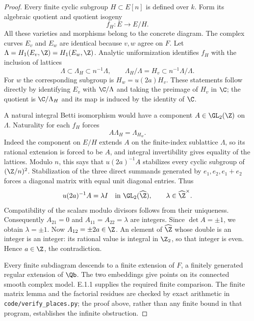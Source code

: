 \begin{proof}
Every finite cyclic subgroup $H\subset E[n]$ is defined over $k$. Form its algebraic quotient and quotient isogeny
\[
 f_H:E\longrightarrow E/H.
\]
All these varieties and morphisms belong to the concrete diagram. The complex curves $E_v$ and $E_w$ are identical because $v,w$ agree on $F$. Let $\Lambda=H_1(E_v,\Z)=H_1(E_w,\Z)$. Analytic uniformization identifies $f_H$ with the inclusion of lattices
\[
 \Lambda\subset\Lambda_H\subset n^{-1}\Lambda,
 \qquad \Lambda_H/\Lambda=H_v\subset n^{-1}\Lambda/\Lambda.
\]
For $w$ the corresponding subgroup is $H_w=u(2a)H_v$. These statements follow directly by identifying $E_v$ with $\C/\Lambda$ and taking the preimage of $H_v$ in $\C$; the quotient is $\C/\Lambda_H$ and its map is induced by the identity of $\C$.

A natural integral Betti isomorphism would have a component $A\in\GL_2(\Z)$ on $\Lambda$. Naturality for each $f_H$ forces
\[
 A\Lambda_H=\Lambda_{H_w}.
\]
Indeed the component on $E/H$ extends $A$ on the finite-index sublattice $\Lambda$, so its rational extension is forced to be $A$, and integral invertibility gives equality of the lattices. Modulo $n$, this says that $u(2a)^{-1}A$ stabilizes every cyclic subgroup of $(\Z/n)^2$. Stabilization of the three direct summands generated by $e_1,e_2,e_1+e_2$ forces a diagonal matrix with equal unit diagonal entries. Thus
\[
 u(2a)^{-1}A=\lambda I\quad\hbox{in }\GL_2(\widehat\Z),
 \qquad \lambda\in\widehat\Z^{\times}.
\]
Compatibility of the scalars modulo divisors follows from their uniqueness. Consequently $A_{21}=0$ and $A_{11}=A_{22}=\lambda$ are integers. Since $\det A=\pm1$, we obtain $\lambda=\pm1$. Now $A_{12}=\pm2a\in\Z$. An element of $\widehat\Z$ whose double is an integer is an integer: its rational value is integral in $\Z_2$, so that integer is even. Hence $a\in\Z$, the contradiction.

Every finite subdiagram descends to a finite extension of $F$, a finitely generated regular extension of $\Qb$. The two embeddings give points on its connected smooth complex model. E.1.1 supplies the required finite comparison. The finite matrix lemma and the factorial residues are checked by exact arithmetic in \texttt{code/verify\_places.py}; the proof above, rather than any finite bound in that program, establishes the infinite obstruction.
\end{proof}

